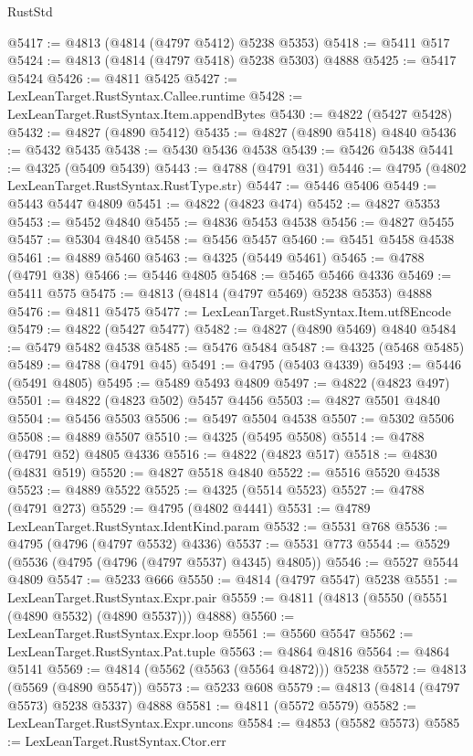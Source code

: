 \begin{lexlean}{RustStd}
\begin{coremodule}
@5417 := @4813 (@4814 (@4797 @5412) @5238 @5353)
@5418 := @5411 @517
@5424 := @4813 (@4814 (@4797 @5418) @5238 @5303) @4888
@5425 := @5417 @5424
@5426 := @4811 @5425
@5427 := LexLeanTarget.RustSyntax.Callee.runtime
@5428 := LexLeanTarget.RustSyntax.Item.appendBytes
@5430 := @4822 (@5427 @5428)
@5432 := @4827 (@4890 @5412)
@5435 := @4827 (@4890 @5418) @4840
@5436 := @5432 @5435
@5438 := @5430 @5436 @4538
@5439 := @5426 @5438
@5441 := @4325 (@5409 @5439)
@5443 := @4788 (@4791 @31)
@5446 := @4795 (@4802 LexLeanTarget.RustSyntax.RustType.str)
@5447 := @5446 @5406
@5449 := @5443 @5447 @4809
@5451 := @4822 (@4823 @474)
@5452 := @4827 @5353
@5453 := @5452 @4840
@5455 := @4836 @5453 @4538
@5456 := @4827 @5455
@5457 := @5304 @4840
@5458 := @5456 @5457
@5460 := @5451 @5458 @4538
@5461 := @4889 @5460
@5463 := @4325 (@5449 @5461)
@5465 := @4788 (@4791 @38)
@5466 := @5446 @4805
@5468 := @5465 @5466 @4336
@5469 := @5411 @575
@5475 := @4813 (@4814 (@4797 @5469) @5238 @5353) @4888
@5476 := @4811 @5475
@5477 := LexLeanTarget.RustSyntax.Item.utf8Encode
@5479 := @4822 (@5427 @5477)
@5482 := @4827 (@4890 @5469) @4840
@5484 := @5479 @5482 @4538
@5485 := @5476 @5484
@5487 := @4325 (@5468 @5485)
@5489 := @4788 (@4791 @45)
@5491 := @4795 (@5403 @4339)
@5493 := @5446 (@5491 @4805)
@5495 := @5489 @5493 @4809
@5497 := @4822 (@4823 @497)
@5501 := @4822 (@4823 @502) @5457 @4456
@5503 := @4827 @5501 @4840
@5504 := @5456 @5503
@5506 := @5497 @5504 @4538
@5507 := @5302 @5506
@5508 := @4889 @5507
@5510 := @4325 (@5495 @5508)
@5514 := @4788 (@4791 @52) @4805 @4336
@5516 := @4822 (@4823 @517)
@5518 := @4830 (@4831 @519)
@5520 := @4827 @5518 @4840
@5522 := @5516 @5520 @4538
@5523 := @4889 @5522
@5525 := @4325 (@5514 @5523)
@5527 := @4788 (@4791 @273)
@5529 := @4795 (@4802 @4441)
@5531 := @4789 LexLeanTarget.RustSyntax.IdentKind.param
@5532 := @5531 @768
@5536 := @4795 (@4796 (@4797 @5532) @4336)
@5537 := @5531 @773
@5544 := @5529 (@5536 (@4795 (@4796 (@4797 @5537) @4345) @4805))
@5546 := @5527 @5544 @4809
@5547 := @5233 @666
@5550 := @4814 (@4797 @5547) @5238
@5551 := LexLeanTarget.RustSyntax.Expr.pair
@5559 := @4811 (@4813 (@5550 (@5551 (@4890 @5532) (@4890 @5537))) @4888)
@5560 := LexLeanTarget.RustSyntax.Expr.loop
@5561 := @5560 @5547
@5562 := LexLeanTarget.RustSyntax.Pat.tuple
@5563 := @4864 @4816
@5564 := @4864 @5141
@5569 := @4814 (@5562 (@5563 (@5564 @4872))) @5238
@5572 := @4813 (@5569 (@4890 @5547))
@5573 := @5233 @608
@5579 := @4813 (@4814 (@4797 @5573) @5238 @5337) @4888
@5581 := @4811 (@5572 @5579)
@5582 := LexLeanTarget.RustSyntax.Expr.uncons
@5584 := @4853 (@5582 @5573)
@5585 := LexLeanTarget.RustSyntax.Ctor.err

\end{coremodule}
\end{lexlean}
